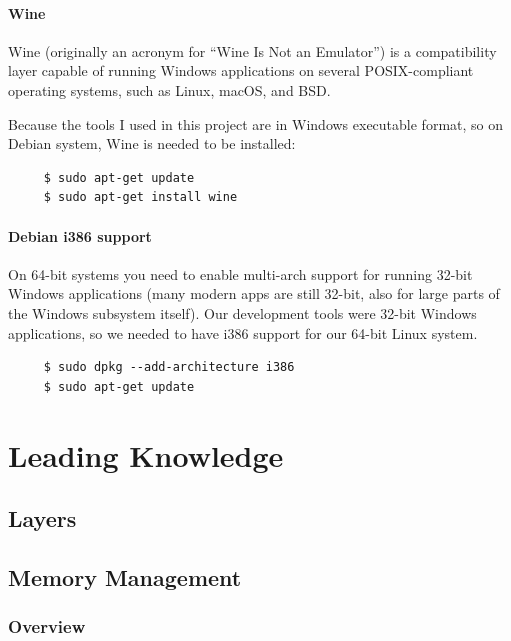 \documentclass{swfcthesis}
\begin{document}
\subsubsection{Wine}

Wine (originally an acronym for ``Wine Is Not an Emulator'') is a compatibility layer
capable of running Windows applications on several POSIX-compliant operating systems, such
as Linux, macOS, and BSD\cite{wiki:wine}.

Because the tools I used in this project are in Windows executable format, so on Debian system,
Wine is needed to be installed:

\begin{verbatim}
     $ sudo apt-get update
     $ sudo apt-get install wine
\end{verbatim}

\subsubsection{Debian i386 support}

On 64-bit systems you need to enable multi-arch support for running 32-bit Windows
applications (many modern apps are still 32-bit, also for large parts of the Windows
subsystem itself). Our development tools were 32-bit Windows applications, so we needed to
have i386 support for our 64-bit Linux system.

\begin{verbatim}
     $ sudo dpkg --add-architecture i386
     $ sudo apt-get update
\end{verbatim}

\chapter{Leading Knowledge}
\label{cha:leading-knowledge-1}

\section{Layers}
\label{sec:layers}

\section{Memory Management}
\label{sec:memory-management}

\subsection{Overview}
\label{sec:overview}
\end{document}
